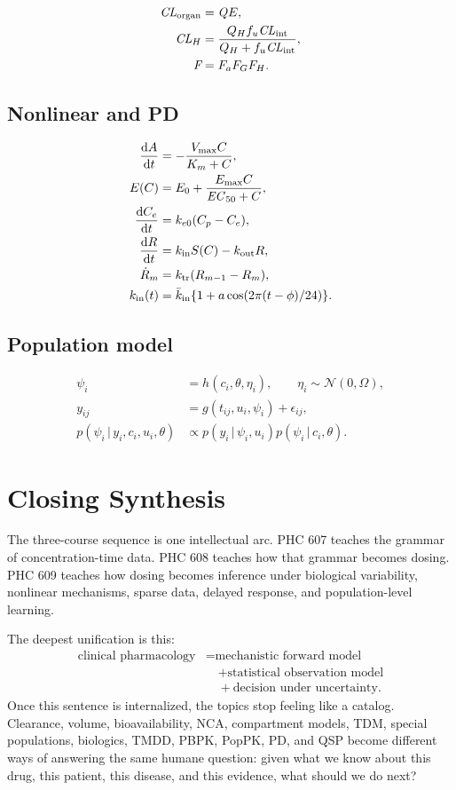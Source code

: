 \documentclass[a4paper]{article}
\newcommand{\Normal}{\mathcal{N}}
\newcommand{\given}{\,|\,}
\newcommand{\pkCL}{\pksym{CL}}
\newcommand{\pkF}{\pksym{F}}
\newcommand{\pkQ}{\pksym{Q}}
\newcommand{\pkKm}{K_m}
\newcommand{\pkVmax}{V_{\max}}
\newcommand{\pkECfifty}{\pksym{EC}_{50}}
\begin{document}
\[
\begin{aligned}
\pkCL_{\pklab{organ}}&=\pkQ E,\\
\pkCL_H&=\frac{Q_Hf_u\pkCL_{\pklab{int}}}{Q_H+f_u\pkCL_{\pklab{int}}},\\
\pkF&=F_aF_GF_H.
\end{aligned}
\]

\subsection{Nonlinear and PD}

\[
\begin{aligned}
\frac{\dd A}{\dd t}
&=
-\frac{\pkVmax C}{\pkKm+C},\\
E(C)&=E_0+\frac{\Emax C}{\pkECfifty+C},\\
\frac{\dd C_e}{\dd t}&=k_{e0}(C_p-C_e),\\
\frac{\dd R}{\dd t}&=k_{\pklab{in}}S(C)-k_{\pklab{out}}R,\\
\dot R_m&=k_{\pklab{tr}}(R_{m-1}-R_m),\\
k_{\pklab{in}}(t)&=\bar k_{\pklab{in}}\{1+a\cos(2\pi(t-\phi)/24)\}.
\end{aligned}
\]

\subsection{Population model}

\[
\begin{aligned}
\psi_i&=h(c_i,\theta,\eta_i),\qquad \eta_i\sim\Normal(0,\Omega),\\
y_{ij}&=g(t_{ij},u_i,\psi_i)+\epsilon_{ij},\\
p(\psi_i\given y_i,c_i,u_i,\theta)
&\propto
p(y_i\given\psi_i,u_i)p(\psi_i\given c_i,\theta).
\end{aligned}
\]

\section{Closing Synthesis}

The three-course sequence is one intellectual arc. PHC 607 teaches the grammar of concentration-time data. PHC 608 teaches how that grammar becomes dosing. PHC 609 teaches how dosing becomes inference under biological variability, nonlinear mechanisms, sparse data, delayed response, and population-level learning.

The deepest unification is this:
\[
  \begin{aligned}
  \text{clinical pharmacology}
  &=
  \text{mechanistic forward model}\\
  &\quad+
  \text{statistical observation model}\\
  &\quad+
  \text{decision under uncertainty}.
  \end{aligned}
\]
Once this sentence is internalized, the topics stop feeling like a catalog. Clearance, volume, bioavailability, NCA, compartment models, TDM, special populations, biologics, TMDD, PBPK, PopPK, PD, and QSP become different ways of answering the same humane question: given what we know about this drug, this patient, this disease, and this evidence, what should we do next?



\end{document}
